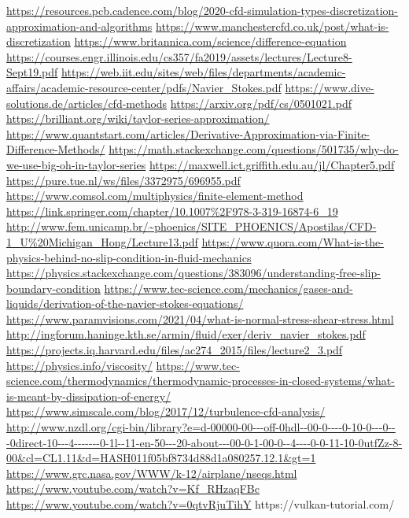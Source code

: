 \documentclass{article}
\begin{document}
\newpage
\begin{thebibliography}{3}
\url{https://resources.pcb.cadence.com/blog/2020-cfd-simulation-types-discretization-approximation-and-algorithms}
\url{https://www.manchestercfd.co.uk/post/what-is-discretization}
\url{https://www.britannica.com/science/difference-equation}
\url{https://courses.engr.illinois.edu/cs357/fa2019/assets/lectures/Lecture8-Sept19.pdf}
\url{https://web.iit.edu/sites/web/files/departments/academic-affairs/academic-resource-center/pdfs/Navier_Stokes.pdf}
\url{https://www.dive-solutions.de/articles/cfd-methods}
\url{https://arxiv.org/pdf/cs/0501021.pdf}
\url{https://brilliant.org/wiki/taylor-series-approximation/}
\url{https://www.quantstart.com/articles/Derivative-Approximation-via-Finite-Difference-Methods/}
\url{https://math.stackexchange.com/questions/501735/why-do-we-use-big-oh-in-taylor-series}
\url{https://maxwell.ict.griffith.edu.au/jl/Chapter5.pdf}
\url{https://pure.tue.nl/ws/files/3372975/696955.pdf}
\url{https://www.comsol.com/multiphysics/finite-element-method}
\url{https://link.springer.com/chapter/10.1007\%2F978-3-319-16874-6\_19}
\url{http://www.fem.unicamp.br/~phoenics/SITE_PHOENICS/Apostilas/CFD-1_U\%20Michigan_Hong/Lecture13.pdf}
\url{https://www.quora.com/What-is-the-physics-behind-no-slip-condition-in-fluid-mechanics}
\url{https://physics.stackexchange.com/questions/383096/understanding-free-slip-boundary-condition}
\url{https://www.tec-science.com/mechanics/gases-and-liquids/derivation-of-the-navier-stokes-equations/}
\url{https://www.paramvisions.com/2021/04/what-is-normal-stress-shear-stress.html}
\url{http://ingforum.haninge.kth.se/armin/fluid/exer/deriv_navier_stokes.pdf}
\url{https://projects.iq.harvard.edu/files/ac274_2015/files/lecture2_3.pdf}
\url{https://physics.info/viscosity/}
\url{https://www.tec-science.com/thermodynamics/thermodynamic-processes-in-closed-systems/what-is-meant-by-dissipation-of-energy/}
\url{https://www.simscale.com/blog/2017/12/turbulence-cfd-analysis/}
\url{http://www.nzdl.org/cgi-bin/library?e=d-00000-00---off-0hdl--00-0----0-10-0---0---0direct-10---4-------0-1l--11-en-50---20-about---00-0-1-00-0--4----0-0-11-10-0utfZz-8-00\&cl=CL1.11\&d=HASH011f05bf8734d88d1a080257.12.1\&gt=1}
\url{https://www.grc.nasa.gov/WWW/k-12/airplane/nseqs.html}
\url{https://www.youtube.com/watch?v=Kf_RHzaqFBc}
\url{https://www.youtube.com/watch?v=0qtvRjuTihY}
https://vulkan-tutorial.com/
\end{thebibliography}
\end{document}
